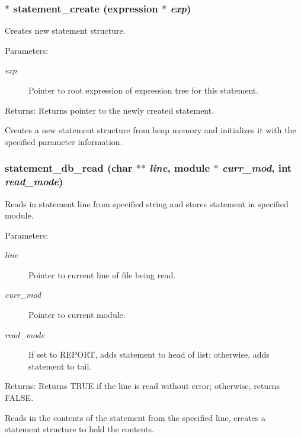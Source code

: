 \subsubsection{$\ast$ statement\_\-create ({\bf expression} $\ast$ {\em exp})}\label{statement_8h_a0}


Creates new statement structure.

\begin{Desc}
\item[Parameters:]
\begin{description}
\item[{\em exp}]Pointer to root expression of expression tree for this statement.\end{description}
\end{Desc}
\begin{Desc}
\item[Returns:]Returns pointer to the newly created statement.\end{Desc}
Creates a new statement structure from heap memory and initializes it with the specified parameter information. 
\subsubsection{ statement\_\-db\_\-read (char $\ast$$\ast$ {\em line}, {\bf module} $\ast$ {\em curr\_\-mod}, int {\em read\_\-mode})}\label{statement_8h_a2}


Reads in statement line from specified string and stores statement in specified module.

\begin{Desc}
\item[Parameters:]
\begin{description}
\item[{\em line}]Pointer to current line of file being read. \item[{\em curr\_\-mod}]Pointer to current module. \item[{\em read\_\-mode}]If set to REPORT, adds statement to head of list; otherwise, adds statement to tail.\end{description}
\end{Desc}
\begin{Desc}
\item[Returns:]Returns TRUE if the line is read without error; otherwise, returns FALSE.\end{Desc}
Reads in the contents of the statement from the specified line, creates a statement structure to hold the contents. 
